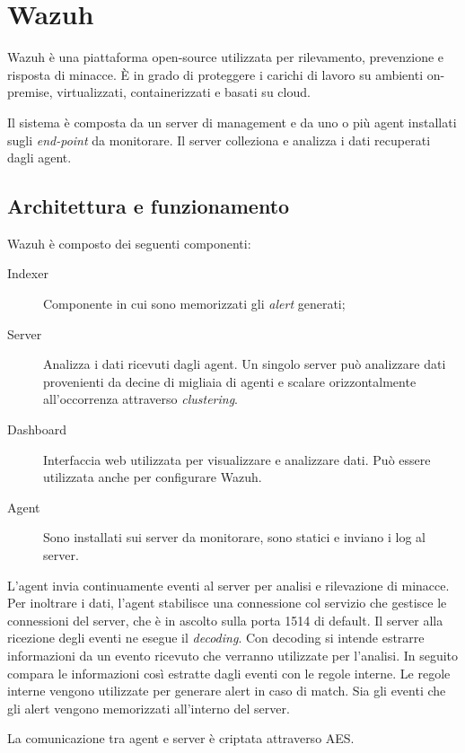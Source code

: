 \section{Wazuh}

Wazuh \cite{wazuh} è una piattaforma open-source utilizzata per rilevamento, prevenzione e risposta di minacce. È in grado di proteggere i carichi di lavoro su ambienti on-premise, virtualizzati, containerizzati e basati su cloud.

Il sistema è composta da un server di management e da uno o più agent installati sugli \textit{end-point} da monitorare. Il server colleziona e analizza i dati recuperati dagli agent.

\subsection{Architettura e funzionamento}
Wazuh è composto dei seguenti componenti:
\begin{description}
    \item [Indexer] Componente in cui sono memorizzati gli \textit{alert} generati;
    \item [Server] Analizza i dati ricevuti dagli agent. Un singolo server può analizzare dati provenienti da decine di migliaia di agenti e scalare orizzontalmente all'occorrenza attraverso \textit{clustering}.
    \item [Dashboard] Interfaccia web utilizzata per visualizzare e analizzare dati.  Può essere utilizzata anche per configurare Wazuh.
    \item [Agent] Sono installati sui server da monitorare, sono statici e inviano i log al server.
\end{description}

L'agent invia continuamente eventi al server per analisi e rilevazione di minacce. Per inoltrare i dati, l'agent stabilisce una connessione col servizio che gestisce le connessioni del server, che è in ascolto sulla porta 1514 di default.  Il server alla ricezione degli eventi ne esegue il \textit{decoding}. Con decoding si intende estrarre informazioni da un evento ricevuto che verranno utilizzate per l'analisi. In seguito compara le informazioni così estratte dagli eventi con le regole interne. Le regole interne vengono utilizzate per generare alert in caso di match.
Sia gli eventi che gli alert vengono memorizzati all'interno del server.

La comunicazione tra agent e server è criptata attraverso AES.

